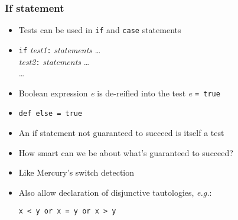 \documentclass[12pt]{beamer}
\begin{document}
\begin{frame}
\frametitle{If statement}
\begin{itemize}
\item Tests can be used in \texttt{if} and \texttt{case} statements
\item \texttt{if} \emph{test1}\texttt{:} \emph{statements} \ldots \\
\hspace*{1em} \emph{test2}\texttt{:} \emph{statements} \ldots \\
\hspace*{1em} \ldots \\
\item Boolean expression \emph{e} is de-reified into the test \emph{e}
  \texttt{= true}
\item \texttt{def else = true}
\item An if statement not guaranteed to succeed is itself a test
\item How smart can we be about what's guaranteed to succeed?
\item Like Mercury's switch detection
\item Also allow declaration of disjunctive tautologies, \emph{e.g.}:\\
  \centerline{\texttt{x < y or x = y or x > y}}
\end{itemize}
\end{frame}
\end{document}

